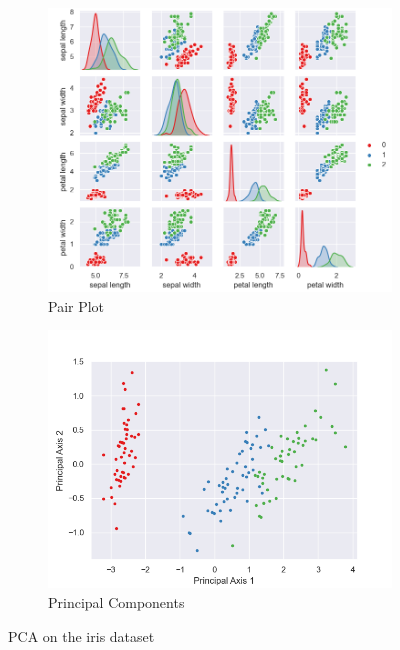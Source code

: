 \documentclass{article}
\begin{document}
\begin{figure}[H]
\centering
\begin{subfigure}{.65\textwidth}
  \centering
  \includegraphics[width=\linewidth]{Images/iris_pairplot.png}
  \caption{Pair Plot}
\end{subfigure}%
\begin{subfigure}{.35\textwidth}
  \centering
  \includegraphics[width=\linewidth]{Images/principal_axes.png}
  \caption{Principal Components}
\end{subfigure}
\caption{PCA on the iris dataset}
\end{figure}
\end{document}
